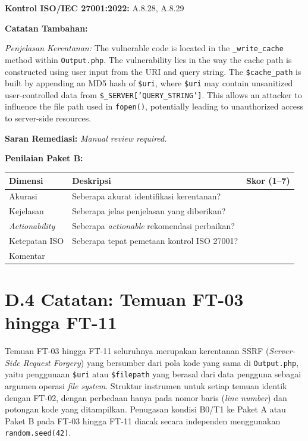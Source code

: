 \textbf{Kontrol ISO/IEC 27001:2022:} A.8.28, A.8.29

\bigskip
\textbf{Catatan Tambahan:}

\textit{Penjelasan Kerentanan:}
The vulnerable code is located in the \texttt{\_write\_cache} method
within \texttt{Output.php}. The vulnerability lies in the way the
cache path is constructed using user input from the URI and query
string. The \texttt{\$cache\_path} is built by appending an MD5 hash
of \texttt{\$uri}, where \texttt{\$uri} may contain unsanitized
user-controlled data from \texttt{\$\_SERVER['QUERY\_STRING']}.
This allows an attacker to influence the file path used in
\texttt{fopen()}, potentially leading to unauthorized access to
server-side resources.

\textbf{Saran Remediasi:} \textit{Manual review required.}

\textbf{Penilaian Paket B:}

\begin{center}
\renewcommand{\arraystretch}{1.6}
\begin{tabular}{|l|p{7.5cm}|c|}
\hline
\textbf{Dimensi} & \textbf{Deskripsi} & \textbf{Skor (1--7)} \\
\hline
Akurasi & Seberapa akurat identifikasi kerentanan? & \\
\hline
Kejelasan & Seberapa jelas penjelasan yang diberikan? & \\
\hline
\textit{Actionability} & Seberapa \textit{actionable} rekomendasi perbaikan? & \\
\hline
Ketepatan ISO & Seberapa tepat pemetaan kontrol ISO 27001? & \\
\hline
\multicolumn{2}{|l|}{Komentar} & \\
\hline
\end{tabular}
\end{center}

\section*{D.4 Catatan: Temuan FT-03 hingga FT-11}

Temuan FT-03 hingga FT-11 seluruhnya merupakan kerentanan SSRF
(\textit{Server-Side Request Forgery}) yang bersumber dari pola
kode yang sama di \texttt{Output.php}, yaitu penggunaan
\texttt{\$uri} atau \texttt{\$filepath} yang berasal dari
data pengguna sebagai argumen operasi \textit{file system}.
Struktur instrumen untuk setiap temuan identik dengan FT-02,
dengan perbedaan hanya pada nomor baris (\textit{line number})
dan potongan kode yang ditampilkan. Penugasan kondisi B0/T1 ke
Paket A atau Paket B pada FT-03 hingga FT-11 diacak secara
independen menggunakan \texttt{random.seed(42)}.

